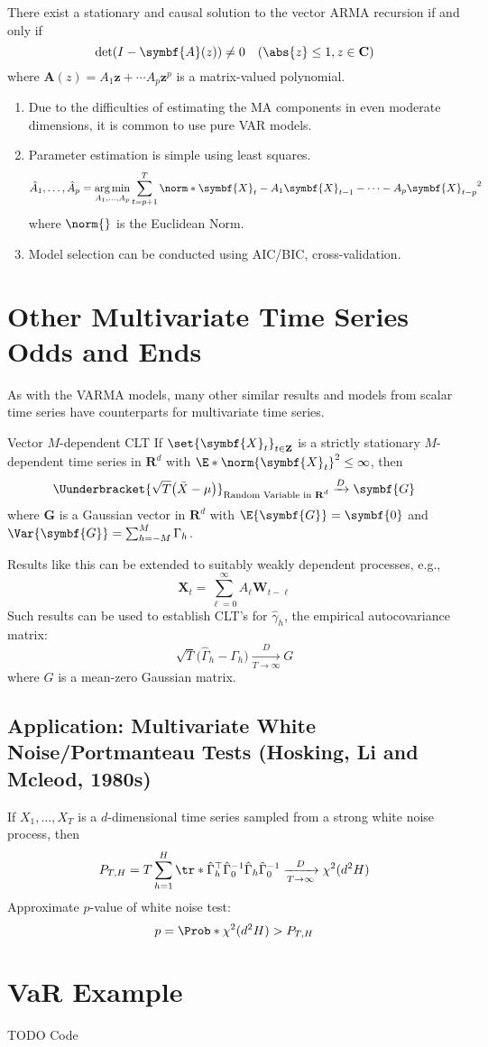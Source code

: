 \begin{Theorem}{}{}
    There exist a stationary and causal solution to the vector ARMA recursion if and only if
    \[ \det(I-\symbf{A}(z))\ne 0\quad(\abs{z}\le 1,z\in\mathbf{C}) \]
    where $ \symbf{A}(z)=A_1 \symbf{z}+\cdots A_p \symbf{z}^p $ is a matrix-valued polynomial.
\end{Theorem}
\begin{Remark}{}{}
    \begin{enumerate}[(1)]
        \item Due to the difficulties of estimating the MA components in even moderate dimensions,
              it is common to use pure VAR models.
        \item Parameter estimation is simple using least squares.
              \[ \hat{A}_1,\ldots,\hat{A}_p=\argmin_{A_1,\ldots,A_p}
                  \sum_{t=p+1}^{T}\norm*{\symbf{X}_t-A_1 \symbf{X}_{t-1}-\cdots -A_p \symbf{X}_{t-p}}^2  \]
              where $ \norm{} $ is the Euclidean Norm.
        \item Model selection can be conducted using AIC/BIC, cross-validation.
    \end{enumerate}
\end{Remark}
\section{Other Multivariate Time Series Odds and Ends}
As with the VARMA models, many other similar results and models
from scalar time series have counterparts for multivariate time series.
\begin{Theorem}{Vector $ M $-dependent CLT}{}
    If $ \set{\symbf{X}_t}_{t\in\mathbf{Z}} $ is a strictly stationary $ M $-dependent
    time series in $ \mathbf{R}^d $ with $ \E*{\norm{\symbf{X}_t}^2}\le \infty $, then
    \[ \Uunderbracket{\sqrt{T}\bigl(\bar{X}-\mu\bigr)}_{\text{Random Variable in $ \mathbf{R}^d $}}\xrightarrow{D}\symbf{G} \]
    where $ \symbf{G} $ is a Gaussian vector in $ \mathbf{R}^d $
    with $ \E{\symbf{G}}=\symbf{0} $ and $ \Var{\symbf{G}}=\sum_{h=-M}^{M} \Gamma_h $.
\end{Theorem}
Results like this can be extended to suitably weakly dependent processes, e.g.,
\[ \symbf{X}_t=\sum_{\ell=0}^{\infty} A_\ell \symbf{W}_{t-\ell} \]
Such results can be used to establish CLT's for $ \hat{\gamma}_h $,
the empirical autocovariance matrix:
\[ \sqrt{T}\bigl(\hat{\Gamma}_h-\Gamma_h\bigr)\xrightarrow[T\to\infty]{D}G \]
where $ G $ is a mean-zero Gaussian matrix.
\subsection*{Application: Multivariate White Noise/Portmanteau Tests (Hosking, Li and Mcleod, 1980s)}
If $ X_1,\ldots,X_T $ is a $ d $-dimensional time series sampled from a strong white noise process, then
\[ P_{T,H}=T \sum_{h=1}^{H} \tr*{\hat{\Gamma}_h^\top \hat{\Gamma}_0^{-1}\hat{\Gamma}_h\hat{\Gamma}_0^{-1}}
    \xrightarrow[T\to\infty]{D}\chi^2(d^2 H) \]
Approximate $ p $-value of white noise test:
\[ p=\Prob*{\chi^2(d^2 H)>P_{T,H}} \]
\section{VaR Example}
TODO Code
